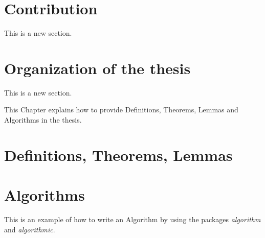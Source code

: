 \section{Contribution}

This is a new section.


\section{Organization of the thesis}

This is a new section.



This Chapter explains how to provide Definitions, Theorems, Lemmas and Algorithms in the thesis.

\section{Definitions, Theorems, Lemmas}




\section{Algorithms}

This is an example of how to write an Algorithm by using the packages \textit{algorithm} and \textit{algorithmic}.


